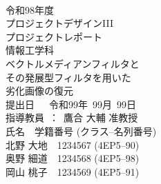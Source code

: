 
\begin{titlepage}
 \begin{center}
  ~\\
  \vspace{1cm}
  {\Large 
  令和98年度\\
 プロジェクトデザインIII\\
  プロジェクトレポート\\
情報工学科\\}
  \vspace{1.3in}
  {\Huge \gtfamily
ベクトルメディアンフィルタと\\
その発展型フィルタを用いた\\
劣化画像の復元\\
  }
  \vspace{2in}
  {\LARGE 
  提出日~~~令和99年~99月~99日\\
  \vspace{0.4in}
  指導教員~：~鷹合 大輔 准教授\\
 \vspace{0.9in}
  氏名　学籍番号 (クラス--名列番号)\\
  \vspace{2mm}
  北野 大地　1234567 (4EP5--90)\\
  奥野 細道　1234568 (4EP5--98)\\
  岡山 桃子　1234569 (4EP5--91)\\
  }
 \end{center}
\end{titlepage}
